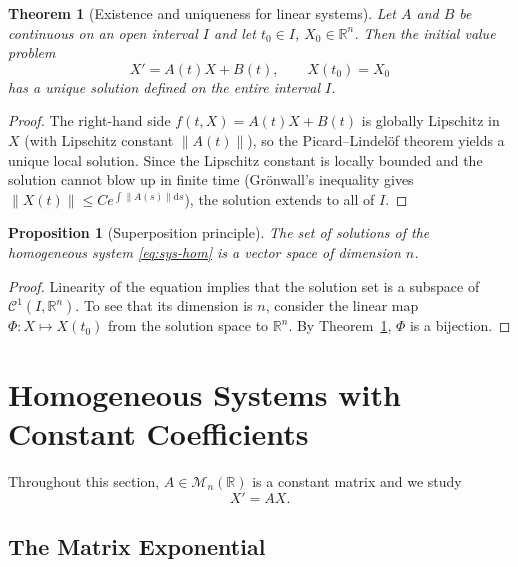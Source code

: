 \documentclass[12pt,a4paper,openany]{book}
\theoremstyle{definition}
\theoremstyle{plain}
\newtheorem{theorem}[definition]{Theorem}
\newtheorem{proposition}[definition]{Proposition}
\theoremstyle{remark}
\newcommand{\R}{\mathbb{R}}
\newcommand{\dd}{\mathrm{d}}
\newcommand{\norm}[1]{\left\|#1\right\|}
\begin{document}
\begin{theorem}[Existence and uniqueness for linear systems]\label{thm:sys-exist}
Let $A$ and $B$ be continuous on an open interval $I$ and let
$t_0\in I$, $X_0\in\R^n$.  Then the initial value problem
\[
  X' = A(t)X + B(t), \qquad X(t_0) = X_0
\]
has a \emph{unique} solution defined on the \emph{entire} interval $I$.
\end{theorem}

\begin{proof}
The right-hand side $f(t,X)=A(t)X+B(t)$ is globally Lipschitz in $X$
(with Lipschitz constant $\norm{A(t)}$), so the Picard--Lindel\"of theorem
yields a unique local solution.  Since the Lipschitz constant is locally
bounded and the solution cannot blow up in finite time (Gr\"onwall's
inequality gives $\norm{X(t)}\le C e^{\int \norm{A(s)}\dd s}$), the solution
extends to all of $I$.
\end{proof}

\begin{proposition}[Superposition principle]\label{prop:superposition-sys}
The set of solutions of the homogeneous system \eqref{eq:sys-hom} is a
vector space of dimension $n$.
\end{proposition}

\begin{proof}
Linearity of the equation implies that the solution set is a subspace of
$\mathcal{C}^1(I,\R^n)$.  To see that its dimension is $n$, consider the
linear map $\Phi:X\mapsto X(t_0)$ from the solution space to $\R^n$.
By Theorem~\ref{thm:sys-exist}, $\Phi$ is a bijection.
\end{proof}

\section{Homogeneous Systems with Constant Coefficients}\label{sec:sys-const}

Throughout this section, $A\in\mathcal{M}_n(\R)$ is a constant matrix
and we study
\begin{equation}\label{eq:sys-const-hom}
  X' = AX.
\end{equation}

\subsection{The Matrix Exponential}\label{subsec:matrix-exp}
\end{document}
